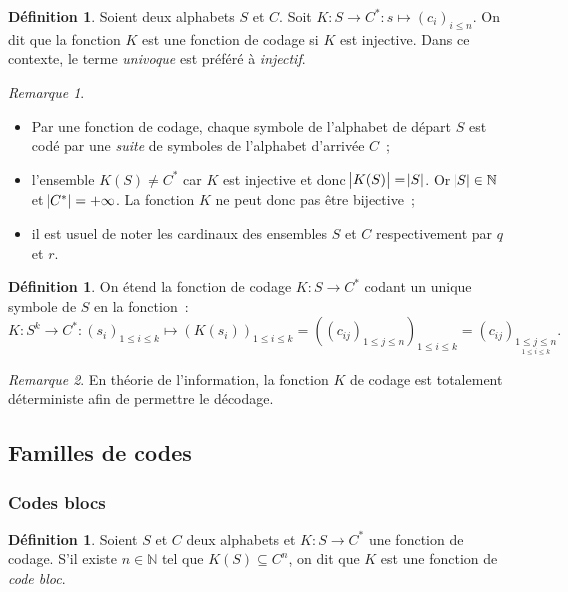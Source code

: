 \documentclass{article}
\newcommand{\N}{\mathbb N}
\theoremstyle{definition}
\newtheorem{déf}[thm]{Définition}
\theoremstyle{remark}
\newtheorem*{rmq}{Remarque}
\begin{document}
		\begin{déf} Soient deux alphabets $S$ et $C$. Soit $K : S \to C^* : s \mapsto (c_i)_{i \leq n}$. On dit que la fonction $K$ est une fonction de codage
		si $K$ est injective. Dans ce contexte, le terme \textit{univoque} est préféré à \textit{injectif}. \end{déf}

		\begin{rmq}~
		\begin{itemize}
			\item Par une fonction de codage, chaque symbole de l'alphabet de départ $S$ est codé par une \textit{suite} de symboles de l'alphabet d'arrivée $C$~;
			\item l'ensemble $K(S) \neq C^*$ car $K$ est injective et donc $\abs {K(S)}  = \abs S$. Or $\abs S \in \N$ et $\abs {C^*} = +\infty$. La fonction
			      $K$ ne peut donc pas être bijective~;
			\item il est usuel de noter les cardinaux des ensembles $S$ et $C$ respectivement par $q$ et $r$.
		\end{itemize}
		\end{rmq}

		\begin{déf} On étend la fonction de codage $K : S \to C^*$ codant un unique symbole de $S$ en la fonction~:
		\[K : S^k \to C^* : (s_i)_{1 \leq i \leq k} \mapsto \left(K(s_i)\right)_{1 \leq i \leq k} =
			\left(\left(c_{ij}\right)_{1 \leq j \leq n}\right)_{1 \leq i \leq k} = \left(c_{ij}\right)_{\underset{1 \leq i \leq k}{1 \leq j \leq n}}.\]
		\end{déf}

		\begin{rmq} En théorie de l'information, la fonction $K$ de codage est totalement déterministe afin de permettre le décodage. \end{rmq}

	\subsection{Familles de codes}
		\subsubsection{Codes blocs}
			\begin{déf} Soient $S$ et $C$ deux alphabets et $K : S \to C^*$ une fonction de codage. S'il existe $n \in \N$ tel que $K(S) \subseteq C^n$, on
			dit que $K$ est une fonction de \textit{code bloc}. \end{déf}
\end{document}
